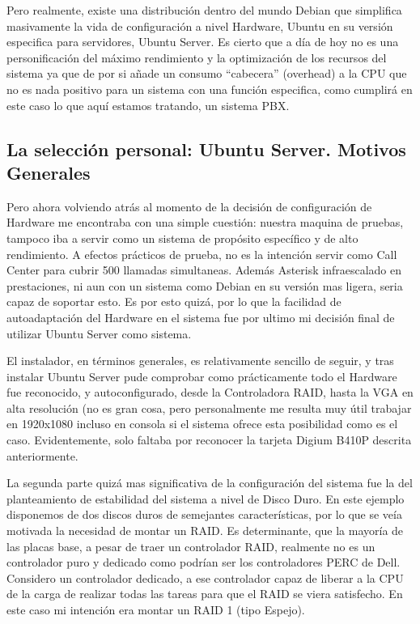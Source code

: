 Pero realmente, existe una distribución dentro del mundo Debian que simplifica masivamente la vida de configuración a nivel Hardware, Ubuntu en su versión especifica para servidores, Ubuntu Server. Es cierto que a día de hoy no es una personificación del máximo rendimiento y la optimización de los recursos del sistema ya que de por si añade un consumo “cabecera” (overhead) a la CPU que no es nada positivo para un sistema con una función especifica, como cumplirá en este caso lo que aquí estamos tratando, un sistema PBX.

\subsection{La selección personal: Ubuntu Server. Motivos Generales}

Pero ahora volviendo atrás al momento de la decisión de configuración de Hardware me encontraba con una simple cuestión: nuestra maquina de pruebas, tampoco iba a servir como un sistema de propósito específico y de alto rendimiento. A efectos prácticos de prueba, no es la intención servir como Call Center para cubrir 500 llamadas simultaneas. Además Asterisk infraescalado en prestaciones, ni aun con un sistema como Debian en su versión mas ligera, seria capaz de soportar esto. Es por esto quizá, por lo que la facilidad de autoadaptación del Hardware en el sistema fue por ultimo mi decisión final de utilizar Ubuntu Server como sistema.

El instalador, en términos generales, es relativamente sencillo de seguir, y tras instalar Ubuntu Server pude comprobar como prácticamente todo el Hardware fue reconocido, y autoconfigurado, desde la Controladora RAID, hasta la VGA en alta resolución (no es gran cosa, pero personalmente me resulta muy útil trabajar en 1920x1080 incluso en consola si el sistema ofrece esta posibilidad como es el caso. Evidentemente, solo faltaba por reconocer la tarjeta Digium B410P descrita anteriormente.

La segunda parte quizá mas significativa de la configuración del sistema fue la del planteamiento de estabilidad del sistema a nivel de Disco Duro. En este ejemplo disponemos de dos discos duros de semejantes características, por lo que se veía motivada la necesidad de montar un RAID. Es determinante, que la mayoría de las placas base, a pesar de traer un controlador RAID, realmente no es un controlador puro y dedicado como podrían ser los controladores PERC de Dell. Considero un controlador dedicado, a ese controlador capaz de liberar a la CPU de la carga de realizar todas las tareas para que el RAID se viera satisfecho. En este caso mi intención era montar un RAID 1 (tipo Espejo).


